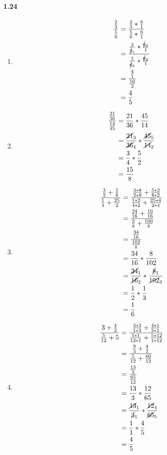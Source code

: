\documentclass{article}
\newcommand\litem[1]{\item{\bfseries#1\space}}
\begin{document}
\paragraph{1.24}
\begin{enumerate}[label=\emph{\alph*})]
\litem{
\begin{align*}
  \frac{\frac{2}{3}}{\frac{5}{6}} &= \frac{\frac{2}{3} * \frac{6}{1}}{\frac{5}{6} * \frac{6}{1}} \\
  &= \frac{\frac{2}{\cancel{3}_1} * \frac{\cancel{6}_2}{1}}{\frac{5}{\cancel{6}_2} * \frac{\cancel{6}_2}{1}} \\
  &= \frac{\frac{4}{1}}{\frac{10}{2}} \\
  &= \frac{4}{5}
\end{align*}
}
\litem{
\begin{align*}
  \frac{\frac{21}{36}}{\frac{14}{45}} &= \frac{21}{36} * \frac{45}{14} \\
  &= \frac{\cancel{21}_3}{\cancel{36}_4} * \frac{\cancel{45}_5}{\cancel{14}_2} \\
  &= \frac{3}{4} * \frac{5}{2} \\
  &= \frac{15}{8}
\end{align*}
}
\litem{
\begin{align*}
  \frac{\frac{3}{2} + \frac{5}{8}}{\frac{1}{4} + \frac{25}{2}} &= \frac{\frac{3*8}{2*8} + \frac{5*2}{8*2}}{\frac{1*2}{4*2} + \frac{25*4}{2*4}} \\
  &= \frac{\frac{24}{16} + \frac{10}{16}}{\frac{2}{8} + \frac{100}{8}} \\
  &= \frac{\frac{34}{16}}{\frac{102}{8}} \\
  &= \frac{34}{16} * \frac{8}{102} \\
  &= \frac{\cancel{34}_1}{\cancel{16}_2} * \frac{\cancel{8}_1}{\cancel{102}_3} \\
  &= \frac{1}{2} * \frac{1}{3} \\
  &= \frac{1}{6}
\end{align*}
}
\litem{
\begin{align*}
  \frac{3 + \frac{4}{3}}{\frac{5}{12} + 5} &= \frac{\frac{3*3}{1*3} + \frac{4*1}{3*1}}{\frac{5*1}{12*1} + \frac{5*12}{1*12}} \\
  &= \frac{\frac{9}{3} + \frac{4}{3}}{\frac{5}{12} + \frac{60}{12}} \\
  &= \frac{\frac{13}{3}}{\frac{65}{12}} \\
  &= \frac{13}{3} * \frac{12}{65} \\
  &= \frac{\cancel{13}_1}{\cancel{3}_1} * \frac{\cancel{12}_4}{\cancel{65}_5} \\
  &= \frac{1}{1} * \frac{4}{5} \\
  &= \frac{4}{5}
\end{align*}
}
\end{enumerate}
\end{document}
